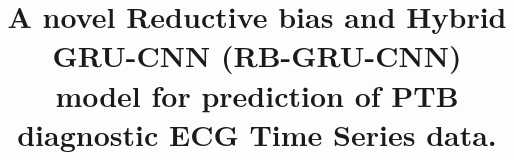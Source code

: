 \documentclass[a4paper, fleqn]{cas-sc}
\begin{document}
\let\WriteBookmarks\relax
\def\floatpagepagefraction{1}
\def\textpagefraction{.001}



\title [mode = title]{A novel Reductive bias and Hybrid GRU-CNN (RB-GRU-CNN) model for prediction of PTB diagnostic ECG Time Series data.}  

\end{document}
